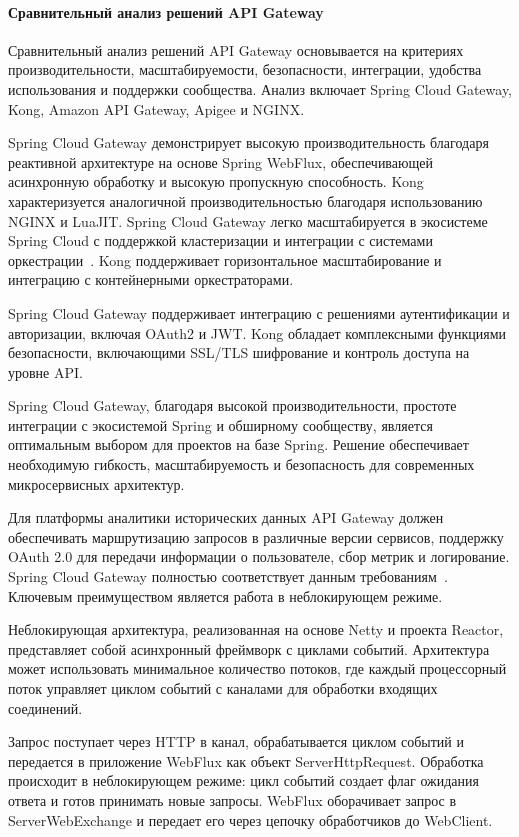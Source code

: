 \paragraph{Сравнительный анализ решений API Gateway}

Сравнительный анализ решений API Gateway основывается на критериях производительности, масштабируемости, безопасности, интеграции, удобства использования и поддержки сообщества. Анализ включает Spring Cloud Gateway, Kong, Amazon API Gateway, Apigee и NGINX.

Spring Cloud Gateway демонстрирует высокую производительность благодаря реактивной архитектуре на основе Spring WebFlux, обеспечивающей асинхронную обработку и высокую пропускную способность.
Kong характеризуется аналогичной производительностью благодаря использованию NGINX и LuaJIT. Spring Cloud Gateway легко масштабируется в экосистеме Spring Cloud с поддержкой кластеризации и интеграции с системами оркестрации~\cite{carnell2021spring}. Kong поддерживает горизонтальное масштабирование и интеграцию с контейнерными оркестраторами.

Spring Cloud Gateway поддерживает интеграцию с решениями аутентификации и авторизации, включая OAuth2 и JWT. Kong обладает комплексными функциями безопасности, включающими SSL/TLS шифрование и контроль доступа на уровне API.

Spring Cloud Gateway, благодаря высокой производительности, простоте интеграции с экосистемой Spring и обширному сообществу, является оптимальным выбором для проектов на базе Spring. Решение обеспечивает необходимую гибкость, масштабируемость и безопасность для современных микросервисных архитектур.


Для платформы аналитики исторических данных API Gateway должен обеспечивать маршрутизацию запросов в различные версии сервисов, поддержку OAuth 2.0 для передачи информации о пользователе, сбор метрик и логирование.
Spring Cloud Gateway полностью соответствует данным требованиям~\cite{spring_cloud_gateway}. Ключевым преимуществом является работа в неблокирующем режиме.

Неблокирующая архитектура, реализованная на основе Netty и проекта Reactor, представляет собой асинхронный фреймворк с циклами событий. Архитектура может использовать минимальное количество потоков, где каждый процессорный поток управляет циклом событий с каналами для обработки входящих соединений.

Запрос поступает через HTTP в канал, обрабатывается циклом событий и передается в приложение WebFlux как объект ServerHttpRequest. Обработка происходит в неблокирующем режиме: цикл событий создает флаг ожидания ответа и готов принимать новые запросы.
WebFlux оборачивает запрос в ServerWebExchange и передает его через цепочку обработчиков до WebClient.

